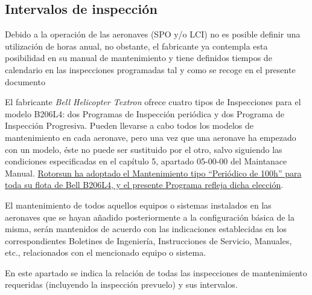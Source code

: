 \documentclass[
]{article}
\begin{document}
\hypertarget{section-5}{%
\subsection*{}\label{section-5}}

\hypertarget{intervalos-de-inspecciuxf3n-1}{%
\subsection{Intervalos de
inspección}\label{intervalos-de-inspecciuxf3n-1}}

Debido a la operación de las aeronaves (SPO y/o LCI) no es posible
definir una utilización de horas anual, no obstante, el fabricante ya
contempla esta posibilidad en su manual de mantenimiento y tiene
definidos tiempos de calendario en las inspecciones programadas tal y
como se recoge en el presente documento

El fabricante \emph{Bell Helicopter Textron} ofrece cuatro tipos de
Inspecciones para el modelo B206L4: dos Programas de Inspección
periódica y dos Programa de Inspección Progresiva. Pueden llevarse a
cabo todos los modelos de mantenimiento en cada aeronave, pero una vez
que una aeronave ha empezado con un modelo, éste no puede ser sustituido
por el otro, salvo siguiendo las condiciones especificadas en el
capítulo 5, apartado 05-00-00 del Maintanace Manual. \ul{Rotorsun ha
adoptado el Mantenimiento tipo ``Periódico de 100h'' para toda su flota
de Bell B206L4, y el presente Programa refleja dicha elección}.

El mantenimiento de todos aquellos equipos o sistemas instalados en las
aeronaves que se hayan añadido posteriormente a la configuración básica
de la misma, serán mantenidos de acuerdo con las indicaciones
establecidas en los correspondientes Boletines de Ingeniería,
Instrucciones de Servicio, Manuales, etc., relacionados con el
mencionado equipo o sistema.

En este apartado se indica la relación de todas las inspecciones de
mantenimiento requeridas (incluyendo la inspección prevuelo) y sus
intervalos.
\end{document}
